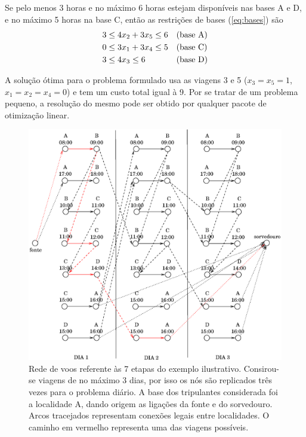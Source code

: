 Se pelo menos 3 horas e no máximo 6 horas estejam disponíveis nas bases A e D, e no máximo 5 horas 
na base C, então as restrições de bases (\ref{eq:bases}) são
%
\begin{equation*}
	\begin{array}{ll}
		3 \leq 4 x_2 + 3 x_5 \leq 6 & \text{(base A)} \vsp \\
		0 \leq 3 x_1 + 3 x_4 \leq 5 & \text{(base C)} \vsp \\
		3 \leq 4 x_3 \leq 6 & \text{(base D)}
	\end{array}
\end{equation*}

A solução ótima para o problema formulado usa as viagens 3 e 5 ($x_3 = x_5 = 1$, 
$x_1 = x_2 = x_4 =  0$) e tem um custo total igual à 9. Por se tratar de um problema pequeno, a
resolução do mesmo pode ser obtido por qualquer pacote de otimização linear.

\begin{figure}[htbp]
	\begin{center}
		\includegraphics[scale=0.80]{fig/rede.eps}
		\caption{Rede de voos referente às 7 etapas do exemplo ilustrativo. Consirou-se viagens de no 
		máximo 3 dias, por isso os nós são replicados três vezes para o problema diário. A base dos 
		tripulantes considerada foi a localidade A, dando origem as ligações da fonte e do sorvedouro.
		Arcos tracejados representam conexões legais entre localidades. O caminho em vermelho representa
		uma das viagens possíveis.}
		\label{fig:rede}
	\end{center}
\end{figure}

